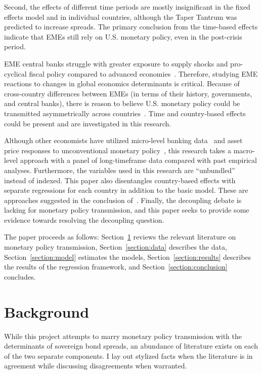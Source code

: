 \documentclass[12pt]{article}
\begin{document}
Second, the effects of different time periods are mostly insignificant in the fixed effects model and in individual countries, although the Taper Tantrum was predicted to increase spreads. The primary conclusion from the time-based effects indicate that EMEs still rely on U.S. monetary policy, even in the post-crisis period.

EME central banks struggle with greater exposure to supply shocks and pro-cyclical fiscal policy compared to advanced economies~\parencite{frankel10}. Therefore, studying EME reactions to changes in global economics determinants is critical. Because of cross-country differences between EMEs (in terms of their history, governments, and central banks), there is reason to believe U.S. monetary policy could be transmitted asymmetrically across countries~\parencite{dudley14}. Time and country-based effects could be present and are investigated in this research. 

Although other economists have utilized micro-level banking data~\parencite{buch19} and asset price responses to unconventional monetary policy~\parencite{bowman14}, this research takes a macro-level approach with a panel of long-timeframe data compared with past empirical analyses. Furthermore, the variables used in this research are ``unbundled'' instead of indexed. This paper also disentangles country-based effects with separate regressions for each country in addition to the basic model. These are approaches suggested in the conclusion of~\textcite{comelli12}. Finally, the decoupling debate is lacking for monetary policy transmission, and this paper seeks to provide some evidence towards resolving the decoupling question.

The paper proceeds as follows: Section~\ref{section:background} reviews the relevant literature on monetary policy transmission, Section~\ref{section:data} describes the data, Section~\ref{section:model} estimates the models, Section~\ref{section:results} describes the results of the regression framework, and Section~\ref{section:conclusion} concludes.
%
%
%
%
%
\section{Background}
\label{section:background}
While this project attempts to marry monetary policy transmission with the determinants of sovereign bond spreads, an abundance of literature exists on each of the two separate components. I lay out stylized facts when the literature is in agreement while discussing disagreements when warranted.
\end{document}
